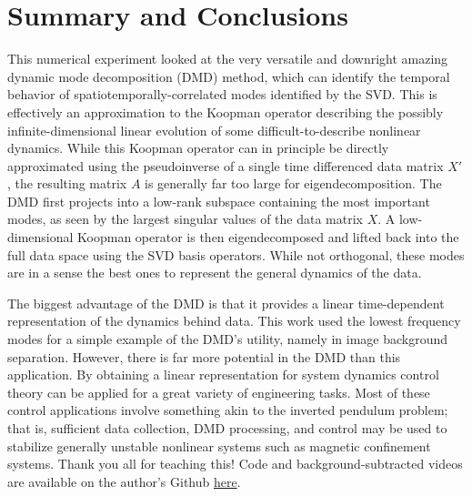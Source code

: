 \documentclass{article}
\begin{document}

\section{Summary and Conclusions}
This numerical experiment looked at the very versatile and downright amazing dynamic mode decomposition (DMD) method, which can identify the temporal behavior of spatiotemporally-correlated modes identified by the SVD. This is effectively an approximation to the Koopman operator describing the possibly infinite-dimensional linear evolution of some difficult-to-describe nonlinear dynamics. While this Koopman operator can in principle be directly approximated using the pseudoinverse of a single time differenced data matrix $X'$, the resulting matrix $A$ is generally far too large for eigendecomposition. The DMD first projects into a low-rank subspace containing the most important modes, as seen by the largest singular values of the data matrix $X$. A low-dimensional Koopman operator is then eigendecomposed and lifted back into the full data space using the SVD basis operators. While not orthogonal, these modes are in a sense the best ones to represent the general dynamics of the data.

The biggest advantage of the DMD is that it provides a linear time-dependent representation of the dynamics behind data. This work used the lowest frequency modes for a simple example of the DMD's utility, namely in image background separation. However, there is far more potential in the DMD than this application. By obtaining a linear representation for system dynamics control theory can be applied for a great variety of engineering tasks. Most of these control applications involve something akin to the inverted pendulum problem; that is, sufficient data collection, DMD processing, and control may be used to stabilize generally unstable nonlinear systems such as magnetic confinement systems. Thank you all for teaching this! Code and background-subtracted videos are available on the author's Github \href{https://github.com/crewsdw/amath582}{here}.
\end{document}
